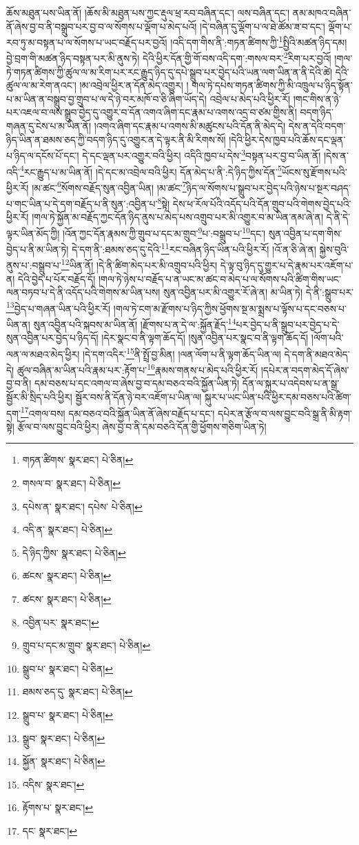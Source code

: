 ཆོས་མཐུན་པས་ཡིན་ནོ། །ཆོས་མི་མཐུན་པས་ཀྱང་རྡུལ་ཕྲ་རབ་བཞིན་དང་། ལས་བཞིན་དང་། ནམ་མཁའ་བཞིན་ནོ་ཞེས་བྱ་བ་ནི་བསྒྲུབ་པར་བྱ་བ་ལ་སོགས་པ་ལྡོག་པ་མེད་པའོ། །དེ་བཞིན་དུ་ལྡོག་པ་ལ་ཐེ་ཚོམ་ཟ་བ་དང་། ལྡོག་པ་རབ་ཏུ་མ་བསྟན་པ་ལ་སོགས་པ་ཡང་བརྗོད་པར་བྱའོ། །འདི་དག་གིས་ནི་:གཏན་ཚིགས་ཀྱི་\footnote{གཏན་ཚིགས་  སྣར་ཐང་།  པེ་ཅིན། }སྤྱིའི་མཚན་ཉིད་དམ། བྱེ་བྲག་གི་མཚན་ཉིད་བསྟན་པར་མི་ནུས་ཏེ། དེའི་ཕྱིར་དོན་གྱི་གོ་བས་འདི་དག་:གསལ་བར་\footnote{གསལ་བ་  སྣར་ཐང་།  པེ་ཅིན། }རིག་པར་བྱའོ། །གལ་ཏེ་གཏན་ཚིགས་ཀྱི་ཚུལ་ལ་མ་རིག་པར་རང་རྒྱུད་ཉིད་དུ་དཔེ་སྒྲུབ་པར་བྱེད་པའི་ཡན་ལག་ཡིན་ན་ནི་དེའི་ཚེ། དེའི་ཚུལ་ལ་མ་རེག་ནའང་། །མ་འབྲེལ་ཕྱིར་ན་དོན་མེད་འགྱུར། །
གལ་ཏེ་དཔེས་གཏན་ཚིགས་ཀྱི་མི་འཁྲུལ་པ་ཉིད་སྟོན་པ་མ་ཡིན་ན་བསྒྲུབ་བྱ་གྲུབ་པ་ལ་དེ་ཉེ་བར་མཁོ་བ་ཅི་ཞིག་ཡོད་དེ། འབྲེལ་པ་མེད་པའི་ཕྱིར་རོ། །གང་གིས་ན་ཉེ་པར་འཇལ་བ་ལས་སྒྲུབ་བྱེད་དུ་འགྱུར་བ་དོན་འགའ་ཞིག་དང་རྣམ་པ་འགས་འདྲ་བ་ཙམ་གྱིས་ནི། བདག་ཉིད་གཞན་དུ་ངེས་པ་མ་ཡིན་ནོ། །འགའ་ཞིག་དང་རྣམ་པ་འགས་མི་མཚུངས་པའི་དོན་ནི་མེད་དེ། དེས་ན་དེའི་བདག་ཉིད་ཡིན་ན་ཐམས་ཅད་ཀྱི་བདག་ཉིད་དུ་འགྱུར་ན་དེ་ལྟར་ནི་མི་རིགས་སོ། །དེའི་ཕྱིར་དེས་ཁྱབ་པའི་ཆོས་དང་ལྡན་པ་ཉིད་ལ་དངོས་པོ་དང་། དེ་དང་ལྡན་པར་འགྱུར་བའི་ཕྱིར། འདིའི་ཁྱབ་པ་དེས་\footnote{དཔེས་ན་  སྣར་ཐང་། དཔེས་  པེ་ཅིན། }བསྟན་པར་བྱ་བ་ཡིན་ནོ། །དེས་ན་འདི་\footnote{འདི་ན་  སྣར་ཐང་།  པེ་ཅིན། }རང་རྒྱུད་པ་མ་ཡིན་ནོ། །དེ་དང་མ་འབྲེལ་བའི་ཕྱིར། དོན་མེད་པ་ནི་:དེ་ཉིད་ཀྱིས་དོན་\footnote{དེ་ཉིད་ཀྱིས་  སྣར་ཐང་།  པེ་ཅིན། }ཡོངས་སུ་རྫོགས་པའི་ཕྱིར་རོ། །མ་ཚང་\footnote{ཚངས་  སྣར་ཐང་།  པེ་ཅིན། }སོགས་བརྗོད་སུན་འབྱིན་ཡིན། །མ་ཚང་\footnote{ཚངས་  སྣར་ཐང་།  པེ་ཅིན། }ཉིད་ལ་སོགས་པ་སྒྲུབ་པར་བྱེད་པའི་ཉེས་པ་སྔར་བཤད་པ་གང་ཡིན་པ་དེ་དག་བརྗོད་པ་ནི་སུན་:འབྱིན་པ་\footnote{འབྱིན་པར་  སྣར་ཐང་། }སྟེ། དེས་ཕ་རོལ་པོའི་འདོད་པའི་དོན་གྲུབ་པའི་གེགས་བྱེད་པའི་ཕྱིར་རོ། །གལ་ཏེ་སྐྱོན་མ་བརྗོད་ཀྱང་དོན་ཉིད་ནུས་པ་མེད་པས་འགྲུབ་པར་མི་འགྱུར་བ་མ་ཡིན་ནམ་ཞེ་ན། དེ་ནི་དེ་ལྟར་ཡིན་མོད་ཀྱི། །འོན་ཀྱང་དོན་རྣམས་ཀྱི་གྲུབ་པ་དང་མ་གྲུབ་\footnote{གྲུབ་པ་དང་མ་གྲུབ་  སྣར་ཐང་།  པེ་ཅིན། }པ་:བསྒྲུབ་པ་\footnote{སྒྲུབ་པ་  སྣར་ཐང་།  པེ་ཅིན། }དང་། སུན་འབྱིན་པ་དག་གིས་བྱེད་པ་ནི་མ་ཡིན་ཏེ། དེ་དག་ནི་:ཐམས་ཅད་དུ་དེའི་\footnote{ཐམས་ཅད་དུ་  སྣར་ཐང་།  པེ་ཅིན། }རང་བཞིན་ཉིད་ཡིན་པའི་ཕྱིར་རོ། །འོ་ན་ཅི་ཞེ་ན། སྐྱེས་བུའི་ནུས་པ་:བསྒྲུབ་པ་\footnote{སྒྲུབ་པ་  སྣར་ཐང་།  པེ་ཅིན། }ཡིན་ནོ། །དེ་ནི་ཚིག་མེད་པར་མི་འགྲུབ་པའི་ཕྱིར། དེ་ལྟ་བུ་ཉིད་དུ་གྱུར་པ་དེ་རྣམ་པར་འཇོག་པ་ན། དེའི་བྱེད་པ་པོར་བརྗོད་དོ། །གལ་ཏེ་ཉེས་པ་བརྗོད་པ་ན་ཡང་མ་ཚང་བ་མེད་པ་ལ་སོགས་པའི་ཚིག་གིས་ཡང་ལན་བཏབ་པ་དེ་ནི་འདོད་པའི་གེགས་མ་ཡིན་པས། སུན་འབྱིན་པར་མི་འགྱུར་རོ་ཞེ་ན། མ་ཡིན་ཏེ། དེ་ནི་:སྒྲུབ་པར་\footnote{སྒྲུབ་  སྣར་ཐང་།  པེ་ཅིན། }བྱེད་པ་གཞན་ཡིན་པའི་ཕྱིར་རོ། །གལ་ཏེ་ངག་མ་རྫོགས་པ་ཉིད་ཀྱིས་ཕྱོགས་སྔ་མ་སྨྲས་པ་ལྟོས་པ་དང་བཅས་པ་ཡིན་ན། སུན་འབྱིན་པའི་སྐབས་མ་ཡིན་ནོ། །རྫོགས་པ་ན་དེ་ལ་:སྐྱོན་རྗོད་\footnote{སྐྱོན་  སྣར་ཐང་།  པེ་ཅིན། }པར་བྱེད་པ་ནི་སྒྲུབ་པར་བྱེད་པ་དེ་སུན་འབྱིན་པར་བྱེད་པ་ཉིད་དོ། །དེར་སྣང་བ་ནི་ལྟག་ཆོད་དོ། །སུན་འབྱིན་པར་སྣང་བ་ནི་ལྟག་ཆོད་དོ། །ལོག་པའི་ལན་ལ་མཐའ་མེད་ཕྱིར། །དེ་དག་འདིར་\footnote{འདིས་  སྣར་ཐང་། }ནི་སྤྲོ་བྱ་མིན། །ལན་ལོག་པ་ནི་ལྟག་ཆོད་ཡིན་ལ། དེ་དག་ནི་མཐའ་མེད་དེ། ཚུལ་བཞིན་མ་ཡིན་པའི་རྣམ་པར་:རྟོག་པ་\footnote{རྟོགས་པ་  སྣར་ཐང་། }རྣམས་གནས་པ་མེད་པའི་ཕྱིར་རོ། །དཔེར་ན་བདག་མེད་དོ་ཞེས་བྱ་བ་ནི། དམ་བཅས་པ་དང་འགལ་བ་ཞེས་བྱ་བ་དམ་བཅའ་བའི་སྐྱོན་ཡིན་ཏེ། དོན་ལ་སྐུར་པ་འདེབས་པ་ན་སྒྲ་སྦྱོར་མི་སྲིད་པའི་ཕྱིར། སྦྱོར་བས་ནི་དོན་ཉེ་བར་འཇོག་པ་ཡིན་ལ། སྐུར་པ་ཡང་ཡིན་པའི་ཕྱིར་དམ་བཅས་པའི་ཚིག་དག་\footnote{དང་  སྣར་ཐང་། }འགལ་བས། དམ་བཅའ་བའི་སྐྱོན་ཡིན་ནོ་ཞེས་བརྗོད་པ་དང་། དཔེར་ན་རྩོལ་བ་ལས་བྱུང་བའི་སྒྲ་ནི་མི་རྟག་སྟེ། རྩོལ་བ་ལས་བྱུང་བའི་ཕྱིར། ཞེས་བྱ་བ་ནི་དམ་བཅའི་དོན་གྱི་ཕྱོགས་གཅིག་ཡིན་ཏེ། 